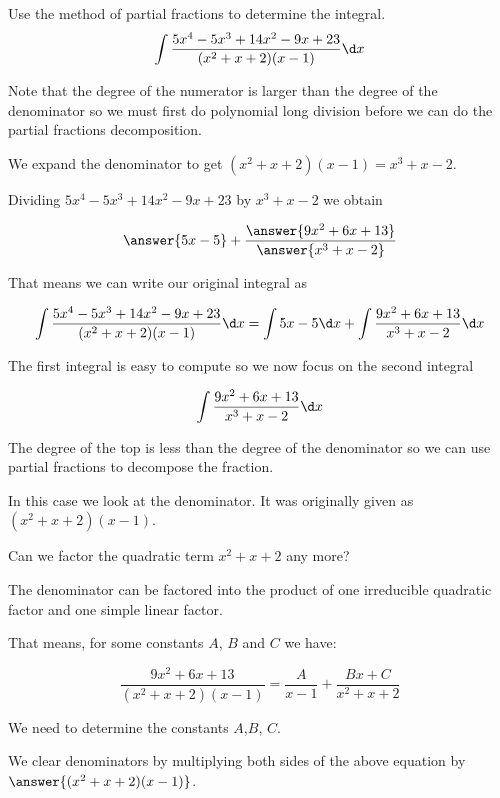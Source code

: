 \documentclass{ximera}
\author{Jason Miller}
\begin{document}
\begin{exercise}
Use the method of partial fractions to determine the integral.
\[
\int \frac{5x^{4}-5x^{3}+14x^{2}-9x+23}{(x^{2}+x+2)(x-1)} \d x
\]


Note that the degree of the numerator is larger than the degree of the denominator so we must first do polynomial 
long division before we can do the partial fractions decomposition. 

We expand the denominator to get 
$(x^{2}+x+2)(x-1)=x^{3}+x-2$. 

Dividing $5x^{4}-5x^{3}+14x^{2}-9x+23$ by $x^{3}+x-2$ we obtain

\[
\answer{ 5x-5}  + \frac{\answer{9x^{2}+6x+13}}{\answer{x^{3}+x-2}} 
\]


\begin{exercise}

That means we can write our original integral as

\[
\int \frac{5x^{4}-5x^{3}+14x^{2}-9x+23}{(x^{2}+x+2)(x-1)} \d x= \int 5x-5 \d x + \int \frac{9x^{2}+6x+13}{x^{3}+x-2} \d x
\]

The first integral is easy to compute so we now focus on the second integral 

\[
 \int \frac{9x^{2}+6x+13}{x^{3}+x-2} \d x
\]

The degree of the top is less than the degree of the denominator so we can use partial fractions to 
decompose the fraction. 


In this case we look at the denominator. It was originally given as $(x^{2}+x+2)(x-1)$. 

Can we factor the quadratic term $x^{2}+x+2$ any more?


  \begin{multipleChoice}
  \end{multipleChoice}


\begin{exercise}

The denominator can be factored into the product of one irreducible quadratic factor and one simple linear factor. 

That means, for some constants $A$, $B$ and $C$ we have:

\[
\frac{9x^{2}+6x+13}{(x^{2}+x+2)(x-1)}= \frac{A}{x-1} + \frac{Bx+C}{x^{2}+x+2}
\]

We need to determine the constants $A$,$B$, $C$. 

We clear denominators by multiplying both sides of the above equation by $\answer{(x^{2}+x+2)(x-1)}$. 


\end{exercise}
\end{exercise}
\end{exercise}
\end{document}

